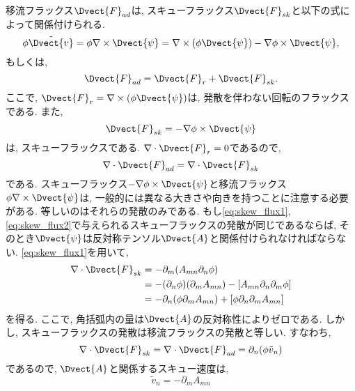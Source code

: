 移流フラックス$\Dvect{F}_{ad}$は, スキューフラックス$\Dvect{F}_{sk}$と以下の式によって関係付けられる. 
\begin{equation}
  \phi \tilde{\Dvect{v}} 
 = \phi \nabla \times \Dvect{\psi} 
 = \nabla \times (\phi \Dvect{\psi}) - \nabla \phi \times \Dvect{\psi}, 
\end{equation}
もしくは, 
\begin{equation}
  \Dvect{F}_{ad} = \Dvect{F}_{r} +\Dvect{F}_{sk}. 
\end{equation}
ここで, $\Dvect{F}_r=\nabla \times (\phi \Dvect{\psi})$は, 発散を伴わない回転のフラックスである.  
また, 
\begin{equation}
  \Dvect{F}_{sk} = - \nabla \phi \times \Dvect{\psi}
\label{eq:skew_flux1}
\end{equation}
は, スキューフラックスである. 
$\nabla \cdot \Dvect{F}_r=0$であるので, 
\begin{equation}
  \nabla \cdot \Dvect{F}_{ad} = \nabla \cdot \Dvect{F}_{sk}
\end{equation}
である. 
スキューフラックス$-\nabla \phi \times \Dvect{\psi}$と移流フラックス$\phi \nabla \times \Dvect{\psi}$は, 
一般的には異なる大きさや向きを持つことに注意する必要がある. 
等しいのはそれらの発散のみである. 
もし\eqref{eq:skew_flux1},\eqref{eq:skew_flux2}で与えられるスキューフラックスの発散が同じであるならば, 
そのとき$\Dvect{\psi}$は反対称テンソル$\Dvect{A}$と関係付けられなければならない. 
\eqref{eq:skew_flux1}を用いて, 
\begin{equation}
\begin{split}
   \nabla \cdot \Dvect{F}_{sk} 
   &= - \partial_m ( A_{mn} \partial_n \phi) \\
   &= - (\partial_n \phi) (\partial_m A_{mn}) - [A_{mn} \partial_n \partial_m \phi] \\
   &= - \partial_n (\phi \partial_m A_{mn}) + [\phi \partial_n \partial_m A_{mn}]
\end{split}
\end{equation}
を得る. 
ここで, 角括弧内の量は$\Dvect{A}$の反対称性によりゼロである. 
しかし, スキューフラックスの発散は移流フラックスの発散と等しい. 
すなわち, 
\begin{equation}
  \nabla \cdot \Dvect{F}_{sk} 
 = \nabla \cdot \Dvect{F}_{ad} 
 = \partial_n (\phi \tilde{v}_n)
\end{equation}
であるので, $\Dvect{A}$と関係するスキュー速度は, 
\begin{equation}
  \tilde{v}_n = - \partial_m A_{mn}
\label{eq:pseudovel_AntiSymTensor_relation}
\end{equation}
